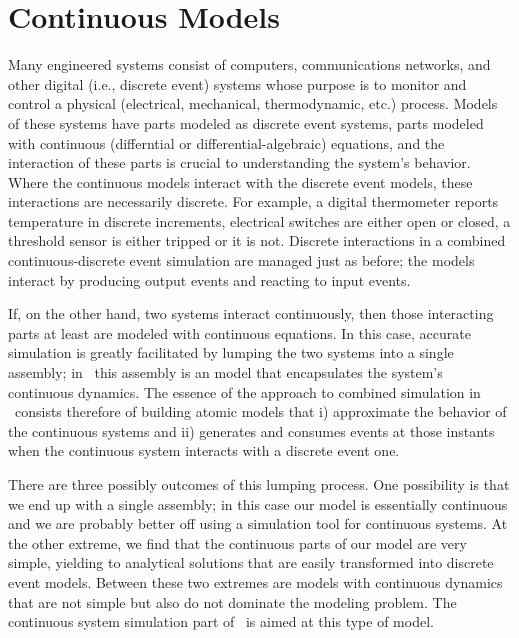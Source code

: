 \chapter{Continuous Models}
Many engineered systems consist of computers, communications networks, and other digital (i.e., discrete event) systems whose purpose is to monitor and control a physical (electrical, mechanical, thermodynamic, etc.) process. Models of these systems have parts modeled as discrete event systems, parts modeled with continuous (differntial or differential-algebraic) equations, and the interaction of these parts is crucial to understanding the system's behavior. Where the continuous models interact with the discrete event models, these interactions are necessarily discrete. For example, a digital thermometer reports temperature in discrete increments, electrical switches are either open or closed, a threshold sensor is either tripped or it is not. Discrete interactions in a combined continuous-discrete event simulation are managed just as before; the models interact by producing output events and reacting to input events.

If, on the other hand, two systems interact continuously, then those interacting parts at least are modeled with continuous equations. In this case, accurate simulation is greatly facilitated by lumping the two systems into a single assembly; in \adevs\ this assembly is an  model that encapsulates the system's continuous dynamics. The essence of the approach to combined simulation in \adevs\ consists therefore of building atomic models that i) approximate the behavior of the continuous systems and ii) generates and consumes events at those instants when the continuous system interacts with a discrete event one.

There are three possibly outcomes of this lumping process. One possibility is that we end up with a single assembly; in this case our model is essentially continuous and we are probably better off using a simulation tool for continuous systems. At the other extreme, we find that the continuous parts of our model are very simple, yielding to analytical solutions that are easily transformed into discrete event models. Between these two extremes are models with continuous dynamics that are not simple but also do not dominate the modeling problem. The continuous system simulation part of \adevs\ is aimed at this type of model.

